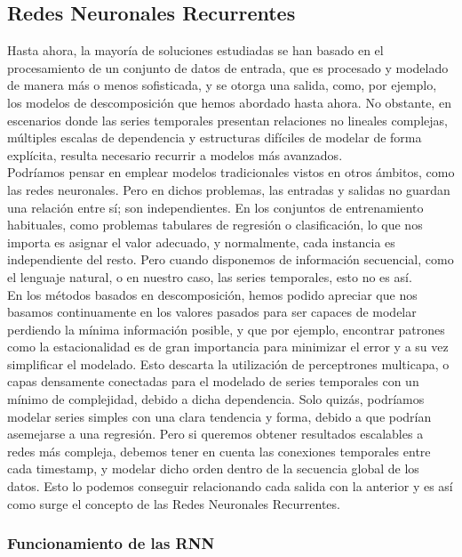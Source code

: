 \subsection{Redes Neuronales Recurrentes}

Hasta ahora, la mayoría de soluciones estudiadas se han basado en el procesamiento de un conjunto de datos de entrada, que es procesado y modelado de manera más o menos sofisticada, y se otorga una salida, como, por ejemplo, los modelos de descomposición que hemos abordado hasta ahora. No obstante, en escenarios donde las series temporales presentan relaciones no lineales complejas, múltiples escalas de dependencia y estructuras difíciles de modelar de forma explícita, resulta necesario recurrir a modelos más avanzados.\\

Podríamos pensar en emplear modelos tradicionales vistos en otros ámbitos, como las redes neuronales. Pero en dichos problemas, las entradas y salidas no guardan una relación entre sí; son independientes. En los conjuntos de entrenamiento habituales, como problemas tabulares de regresión o clasificación, lo que nos importa es asignar el valor adecuado, y normalmente, cada instancia es independiente del resto. Pero cuando disponemos de información secuencial, como el lenguaje natural, o en nuestro caso, las series temporales, esto no es así.\\

En los métodos basados en descomposición, hemos podido apreciar que nos basamos continuamente en los valores pasados para ser capaces de modelar perdiendo la mínima información posible, y que por ejemplo, encontrar patrones como la estacionalidad es de gran importancia para minimizar el error y a su vez simplificar el modelado. Esto descarta la utilización de perceptrones multicapa, o capas densamente conectadas para el modelado de series temporales con un mínimo de complejidad, debido a dicha dependencia. Solo quizás, podríamos modelar series simples con una clara tendencia y forma, debido a que podrían asemejarse a una regresión. Pero si queremos obtener resultados escalables a redes más compleja, debemos tener en cuenta las conexiones temporales entre cada timestamp, y modelar dicho orden dentro de la secuencia global de los datos. Esto lo podemos conseguir relacionando cada salida con la anterior y es así como surge el concepto de las Redes Neuronales Recurrentes.

\subsubsection{Funcionamiento de las RNN}

